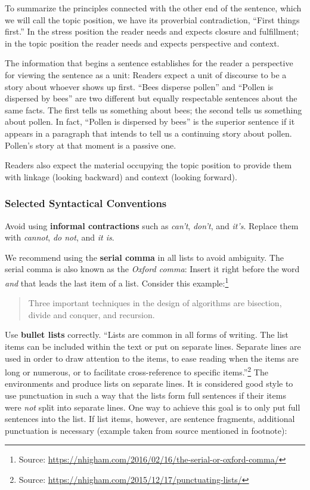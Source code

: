 To summarize the principles connected with the other end of the sentence, which we will call the topic position, we have its proverbial contradiction, “First things first.”
In the stress position the reader needs and expects closure and fulfillment; in the topic position the reader needs and expects perspective and context.

The information that begins a sentence establishes for the reader a perspective for viewing the sentence as a unit: Readers expect a unit of discourse to be a story about whoever shows up first. “Bees disperse pollen” and “Pollen is dispersed by bees” are two different but equally respectable sentences about the same facts. The first tells us something about bees; the second tells us something about pollen. In fact, “Pollen is dispersed by bees” is the superior sentence if it appears in a paragraph that intends to tell us a continuing story about pollen. Pollen’s story at that moment is a passive one.

Readers also expect the material occupying the topic position to provide them with linkage (looking backward) and context (looking forward).

\subsubsection{Selected Syntactical Conventions}

Avoid using \textbf{informal contractions} such as \emph{can't}, \emph{don't}, and \emph{it's}. Replace them with \emph{cannot}, \emph{do not}, and \emph{it is}.

We recommend using the \textbf{serial comma} in all lists to avoid ambiguity. The serial comma is also known as the \emph{Oxford comma}: Insert  it right before the word \emph{and} that leads the last item of a list. Consider this example:\footnote{Source: \url{https://nhigham.com/2016/02/16/the-serial-or-oxford-comma/}}
\begin{quote}
  Three important techniques in the design of algorithms are bisection, divide and conquer, and recursion.
\end{quote}

Use \textbf{bullet lists} correctly. ``Lists are common in all forms of writing. The list items can be included within the text or put on separate lines. Separate lines are used in order to draw attention to the items, to ease reading when the items are long or numerous, or to facilitate cross-reference to specific items.''\footnote{Source: \url{https://nhigham.com/2015/12/17/punctuating-lists/}} The environments  and  produce lists on separate lines. It is considered good style to use punctuation in such a way that the lists form full sentences if their items were \emph{not} split into separate lines. One way to achieve this goal is to only put full sentences into the list. If list items, however, are sentence fragments, additional punctuation is necessary (example taken from source mentioned in footnote):

